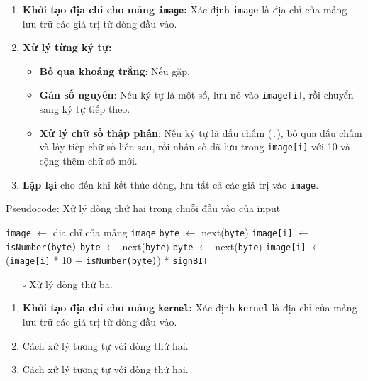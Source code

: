 \documentclass{article}
\begin{document}
\begin{enumerate}
	\item \textbf{Khởi tạo địa chỉ cho mảng \texttt{image}: }Xác định \texttt{\textcolor{black}{image}} là địa chỉ của mảng lưu trữ các giá trị từ dòng đầu vào. 
	\item \textbf{Xử lý từng ký tự:} 
	\begin{itemize}
		\item \textbf{Bỏ qua khoảng trắng}: Nếu gặp.
		\item \textbf{Gán số nguyên}: Nếu ký tự là một số, lưu nó vào \texttt{image[i]}, rồi chuyển sang ký tự tiếp theo.
		\item \textbf{Xử lý chữ số thập phân}: Nếu ký tự là dấu chấm (\texttt{.}), bỏ qua dấu chấm và lấy tiếp chữ số liền sau, rồi nhân số đã lưu trong \texttt{image[i]} với 10 và cộng thêm chữ số mới.
	\end{itemize}
	\item \textbf{Lặp lại} cho đến khi kết thúc dòng, lưu tất cả các giá trị vào \texttt{image}.
\end{enumerate}
\begin{algorithm}
	\caption{Pseudocode: Xử lý dòng thứ hai trong chuỗi đầu vào của input}
	\begin{algorithmic}[1]
		\State \texttt{image} $\gets$ địa chỉ của mảng \texttt{image}
		\State \texttt{byte} $\gets$ next(\texttt{byte})
		\EndIf
		\State \texttt{image[i]} $\gets$ \texttt{isNumber(byte)}
		\State \texttt{byte} $\gets$ next(\texttt{byte})
		\EndIf
		\State \texttt{byte} $\gets$ next(\texttt{byte})
		\State \texttt{image[i]} $\gets$ (\texttt{image[i]} * 10 + \texttt{isNumber(byte)}) * \texttt{signBIT}
		\EndIf
		\EndFor
	\end{algorithmic}
\end{algorithm}
\begin{itemize}
	\item [$\square$] Xử lý dòng thứ ba.
\end{itemize}
\begin{enumerate}
	\item \textbf{Khởi tạo địa chỉ cho mảng \texttt{kernel}: }Xác định \texttt{\textcolor{black}{kernel}} là địa chỉ của mảng lưu trữ các giá trị từ dòng đầu vào. 
	\item Cách xử lý tương tự với dòng thứ hai.
	\item Cách xử lý tương tự với dòng thứ hai.
\end{enumerate}
\end{document}
